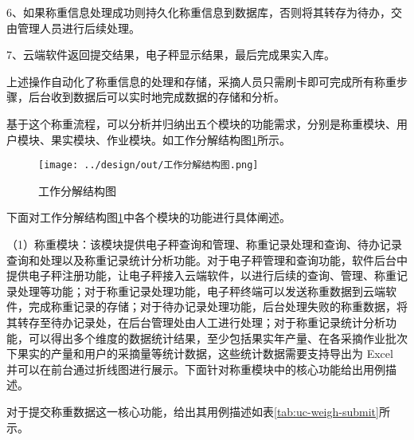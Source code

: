 6、如果称重信息处理成功则持久化称重信息到数据库，否则将其转存为待办，交由管理人员进行后续处理。

7、云端软件返回提交结果，电子秤显示结果，最后完成果实入库。

上述操作自动化了称重信息的处理和存储，采摘人员只需刷卡即可完成所有称重步骤，后台收到数据后可以实时地完成数据的存储和分析。

基于这个称重流程，可以分析并归纳出五个模块的功能需求，分别是称重模块、用户模块、果实模块、作业模块。如工作分解结构图\ref{fig:工作分解结构图}所示。

\begin{figure}[H]
    \centering
    \texttt{[image: ../design/out/工作分解结构图.png]}
    \caption{工作分解结构图}
    \label{fig:工作分解结构图}
\end{figure}

下面对工作分解结构图\ref{fig:工作分解结构图}中各个模块的功能进行具体阐述。

（1）称重模块：该模块提供电子秤查询和管理、称重记录处理和查询、待办记录查询和处理以及称重记录统计分析功能。对于电子秤管理和查询功能，软件后台中提供电子秤注册功能，让电子秤接入云端软件，以进行后续的查询、管理、称重记录处理等功能；对于称重记录处理功能，电子秤终端可以发送称重数据到云端软件，完成称重记录的存储；对于待办记录处理功能，后台处理失败的称重数据，将其转存至待办记录处，在后台管理处由人工进行处理；对于称重记录统计分析功能，可以得出多个维度的数据统计结果，至少包括果实年产量、在各采摘作业批次下果实的产量和用户的采摘量等统计数据，这些统计数据需要支持导出为 Excel 并可以在前台通过折线图进行展示。下面针对称重模块中的核心功能给出用例描述。

对于提交称重数据这一核心功能，给出其用例描述如表\ref{tab:uc-weigh-submit}所示。

